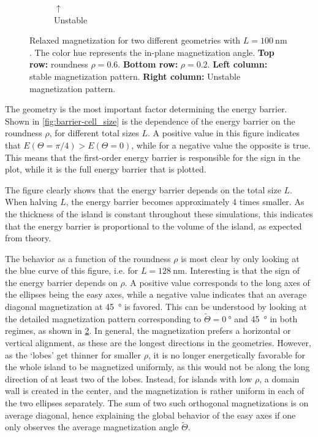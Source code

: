 \documentclass[11pt,a4paper,english]{article}
\begin{document}
\begin{figure}
\begin{subfigure}[b]{0.2\textwidth}
         \caption*{$\uparrow$\\Unstable}
         \label{fig:barrier-magnetization-20x100_ortho}
     \end{subfigure}
    \caption{Relaxed magnetization for two different geometries with $L=\SI{100}{\nano\metre}$. The color hue represents the in-plane magnetization angle. \textbf{Top row:} roundness $\rho=0.6$. \textbf{Bottom row:} $\rho=0.2$. \textbf{Left column:} stable magnetization pattern. \textbf{Right column:} Unstable magnetization pattern.}
    \label{fig:barrier-magnetization}
\end{figure}
The geometry is the most important factor determining the energy barrier. Shown in \cref{fig:barrier-cell_size} is the dependence of the energy barrier on the roundness $\rho$, for different total sizes $L$. A positive value in this figure indicates that $E(\Theta=\pi/4) > E(\Theta=0)$, while for a negative value the opposite is true. This means that the first-order energy barrier is responsible for the sign in the plot, while it is the full energy barrier that is plotted. \par
The figure clearly shows that the energy barrier depends on the total size $L$. When halving $L$, the energy barrier becomes approximately 4 times smaller. As the thickness of the island is constant throughout these simulations, this indicates that the energy barrier is proportional to the volume of the island, as expected from theory. \par
The behavior as a function of the roundness $\rho$ is most clear by only looking at the blue curve of this figure, i.e. for $L=\SI{128}{\nano\metre}$. Interesting is that the sign of the energy barrier depends on $\rho$. A positive value corresponds to the long axes of the ellipses being the easy axes, while a negative value indicates that an average diagonal magnetization at \SI{45}{\degree} is favored. This can be understood by looking at the detailed magnetization pattern corresponding to $\widetilde{\Theta} = \SI{0}{\degree}$ and \SI{45}{\degree} in both regimes, as shown in \cref{fig:barrier-magnetization}. In general, the magnetization prefers a horizontal or vertical alignment, as these are the longest directions in the geometries. However, as the `lobes' get thinner for smaller $\rho$, it is no longer energetically favorable for the whole island to be magnetized uniformly, as this would not be along the long direction of at least two of the lobes. Instead, for islands with low $\rho$, a domain wall is created in the center, and the magnetization is rather uniform in each of the two ellipses separately. The sum of two such orthogonal magnetizations is on average diagonal, hence explaining the global behavior of the easy axes if one only observes the average magnetization angle $\widetilde{\Theta}$.
\end{document}
